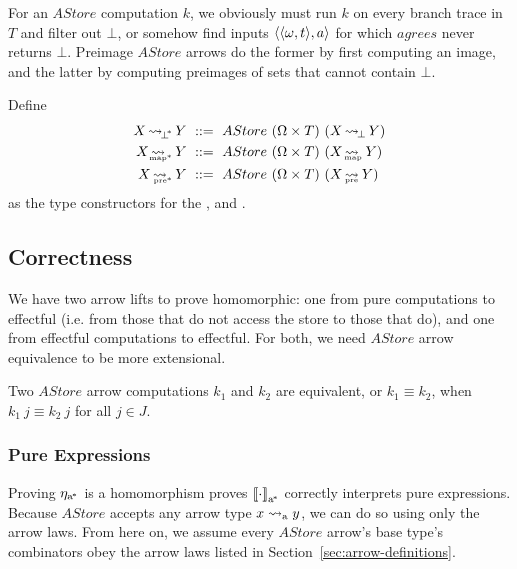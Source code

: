 For an $AStore$ computation $k$, we obviously must run $k$ on every branch trace in $T$ and filter out $\bot$, or somehow find inputs $\langle{\langle{\omega,t}\rangle,a}\rangle$ for which $agrees$ never returns $\bot$.
Preimage $AStore$ arrows do the former by first computing an image, and the latter by computing preimages of sets that cannot contain $\bot$.

\begin{definition}
Define
\begin{equation}
\begin{aligned}
	X \pbotto Y &\ ::=\ AStore~(\Omega \times T)~(X \botto Y) \\
	X \pmapto Y &\ ::=\ AStore~(\Omega \times T)~(X \mapto Y) \\
	X \ppreto Y &\ ::=\ AStore~(\Omega \times T)~(X \preto Y) \\
\end{aligned}
\end{equation}
as the type constructors for the ,  and .
\end{definition}

\subsection{Correctness}

We have two arrow lifts to prove homomorphic: one from pure computations to effectful (i.e. from those that do not access the store to those that do), and one from effectful computations to effectful.
For both, we need $AStore$ arrow equivalence to be more extensional.

\begin{definition}
Two $AStore$ arrow computations $k_1$ and $k_2$ are equivalent, or $k_1 \equiv k_2$, when $k_1~j \equiv k_2~j$ for all $j \in J$.
\end{definition}

\subsubsection{Pure Expressions}
Proving $\eta_\mathrm{a^{\mspace{-2mu}*}}$ is a homomorphism proves $\left\llbracket{\cdot}\right\rrbracket_\mathrm{a^{\mspace{-2mu}*}}$ correctly interprets pure expressions.
Because $AStore$ accepts any arrow type $x \rightsquigarrow_\mathrm{a} y$, we can do so using only the arrow laws.
From here on, we assume every $AStore$ arrow's base type's combinators obey the arrow laws listed in Section~\ref{sec:arrow-definitions}.

